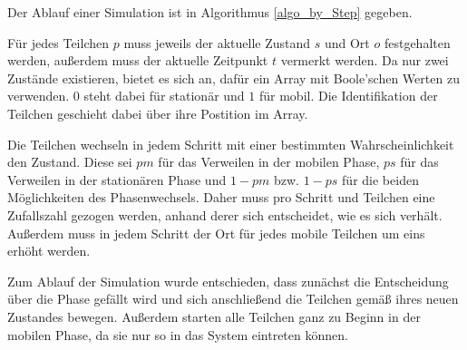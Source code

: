 


Der Ablauf einer Simulation ist in Algorithmus \ref{algo_by_Step} gegeben.

Für jedes Teilchen $p$ muss jeweils der aktuelle Zustand $s$ und Ort $o$ festgehalten werden, außerdem muss der aktuelle Zeitpunkt $t$ vermerkt werden. Da nur zwei Zustände existieren, bietet es sich an, dafür ein Array mit Boole'schen Werten zu verwenden. $0$ steht dabei für stationär und $1$ für mobil. Die Identifikation der Teilchen geschieht dabei über ihre Postition im Array.

Die Teilchen wechseln in jedem Schritt mit einer bestimmten Wahrscheinlichkeit den Zustand. Diese sei $pm$ für das Verweilen in der mobilen Phase, $ps$ für das Verweilen in der stationären Phase und $1-pm$ bzw. $1-ps$ für die beiden Möglichkeiten des Phasenwechsels. Daher muss pro Schritt und Teilchen eine Zufallszahl gezogen werden, anhand derer sich entscheidet, wie es sich verhält. Außerdem muss in jedem Schritt der Ort für jedes mobile Teilchen um eins erhöht werden.

Zum Ablauf der Simulation wurde entschieden, dass zunächst die Entscheidung über die Phase gefällt wird und sich anschließend die Teilchen gemäß ihres neuen Zustandes bewegen. Außerdem starten alle Teilchen ganz zu Beginn in der mobilen Phase, da sie nur so in das System eintreten können.

